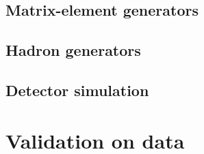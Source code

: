 \subsection{Matrix-element generators}
\label{sec:ME}

\subsection{Hadron generators}
\label{sec:Had}

\subsection{Detector simulation}
\label{sec:det}

\section{Validation on data}
\label{sec:val}


